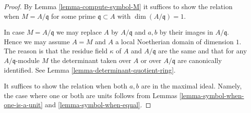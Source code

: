 \documentclass[10pt,a4paper]{amsart}
\theoremstyle{plain}
\theoremstyle{definition}
\theoremstyle{remark}
\numberwithin{equation}{subsection}
\begin{document}
\begin{proof}
By Lemma \ref{lemma-compute-symbol-M} it suffices to show the relation when
$M = A/\mathfrak q$ for some prime $\mathfrak q \subset A$ with
$\dim(A/\mathfrak q) = 1$.

\medskip\noindent
In case $M = A/\mathfrak q$ we may replace $A$ by $A/\mathfrak q$ and
$a, b$ by their images in $A/\mathfrak q$. Hence we may assume $A = M$
and $A$ a local Noetherian domain of dimension $1$. The reason is
that the residue field $\kappa$ of $A$ and $A/\mathfrak q$ are
the same and that for any $A/\mathfrak q$-module $M$ the determinant
taken over $A$ or over $A/\mathfrak q$ are canonically identified.
See Lemma \ref{lemma-determinant-quotient-ring}.

\medskip\noindent
It suffices to show the relation when both
$a, b$ are in the maximal ideal. Namely, the case where one
or both are units follows from Lemmas \ref{lemma-symbol-when-one-is-a-unit}
and \ref{lemma-symbol-when-equal}.


\end{proof}
\end{document}
